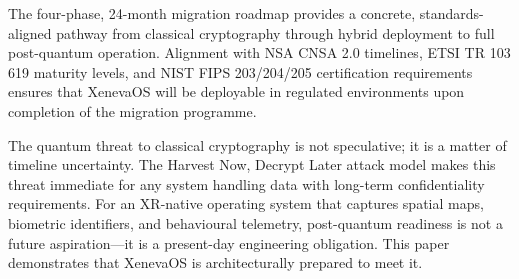 \documentclass[11pt, a4paper]{article}
\begin{document}
The four-phase, 24-month migration roadmap provides a concrete, standards-aligned pathway from classical cryptography through hybrid deployment to full post-quantum operation. Alignment with NSA CNSA 2.0 timelines, ETSI TR 103 619 maturity levels, and NIST FIPS 203/204/205 certification requirements ensures that XenevaOS will be deployable in regulated environments upon completion of the migration programme.

The quantum threat to classical cryptography is not speculative; it is a matter of timeline uncertainty. The Harvest Now, Decrypt Later attack model makes this threat immediate for any system handling data with long-term confidentiality requirements. For an XR-native operating system that captures spatial maps, biometric identifiers, and behavioural telemetry, post-quantum readiness is not a future aspiration---it is a present-day engineering obligation. This paper demonstrates that XenevaOS is architecturally prepared to meet it.
\end{document}
